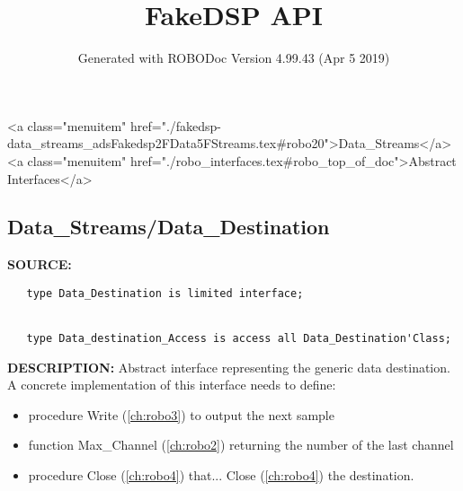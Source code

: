 \documentclass{article}
\title{FakeDSP API}
\author{Generated with ROBODoc Version 4.99.43 (Apr  5 2019)
}
\begin{document}
\maketitle
\printindex
\tableofcontents
\newpage

<a class="menuitem" href="./fakedsp-data_streams_adsFakedsp2FData5FStreams.tex#robo20">Data_Streams</a><a class="menuitem" href="./robo_interfaces.tex#robo_top_of_doc">Abstract Interfaces</a>\subsection{Data\_Streams/Data\_Destination}
\textbf{SOURCE:}\hspace{0.08in}\begin{verbatim}
   type Data_Destination is limited interface;


   type Data_destination_Access is access all Data_Destination'Class;
\end{verbatim}
\textbf{DESCRIPTION:}\hspace{0.08in}
   Abstract interface representing the generic data destination.
   A concrete implementation of this interface needs to define:

\begin{itemize}
  \item    procedure Write (\ref{ch:robo3}) to output the next sample
  \item    function Max\_Channel (\ref{ch:robo2}) returning the number of the
     last channel
  \item    procedure Close (\ref{ch:robo4}) that... Close (\ref{ch:robo4}) the destination.
\end{itemize}
\end{document}
